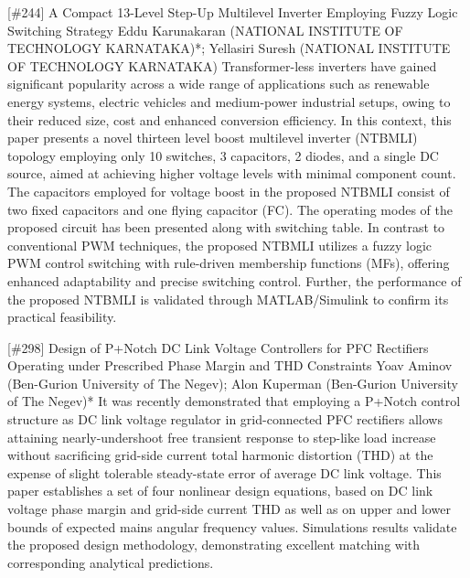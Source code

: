 {} \begin{abstract_online} {[\#244] A Compact 13-Level Step-Up Multilevel Inverter Employing Fuzzy Logic Switching Strategy} {} {Eddu Karunakaran (NATIONAL INSTITUTE OF TECHNOLOGY KARNATAKA)*; Yellasiri Suresh (NATIONAL INSTITUTE OF TECHNOLOGY KARNATAKA)} {} Transformer-less inverters have gained significant popularity across a wide range of applications such as renewable energy systems, electric vehicles and medium-power industrial setups, owing to their reduced size, cost and enhanced conversion efficiency. In this context, this paper presents a novel thirteen level boost multilevel inverter (NTBMLI) topology employing only 10 switches, 3 capacitors, 2 diodes, and a single DC source, aimed at achieving higher voltage levels with minimal component count. The capacitors employed for voltage boost in the proposed NTBMLI consist of two fixed capacitors and one flying capacitor (FC). The operating modes of the proposed circuit has been presented along with switching table. In contrast to conventional PWM techniques, the proposed NTBMLI utilizes a fuzzy logic PWM control switching with rule-driven membership functions (MFs), offering enhanced adaptability and precise switching control. Further, the performance of the proposed NTBMLI is validated through MATLAB/Simulink to confirm its practical feasibility. \end{abstract_online} 
{} \begin{abstract_online} {[\#298] Design of P+Notch DC Link Voltage Controllers for PFC Rectifiers Operating under Prescribed Phase Margin and THD Constraints} {} {Yoav Aminov (Ben-Gurion University of The Negev); Alon Kuperman (Ben-Gurion University of The Negev)*} {} It was recently demonstrated that employing a P+Notch control structure as DC link voltage regulator in grid-connected PFC rectifiers allows attaining nearly-undershoot free transient response to step-like load increase without sacrificing grid-side current total harmonic distortion (THD) at the expense of slight tolerable steady-state error of average DC link voltage. This paper establishes a set of four nonlinear design equations, based on DC link voltage phase margin and grid-side current THD as well as on upper and lower bounds of expected mains angular frequency values. Simulations results validate the proposed design methodology, demonstrating excellent matching with corresponding analytical predictions. \end{abstract_online} 

